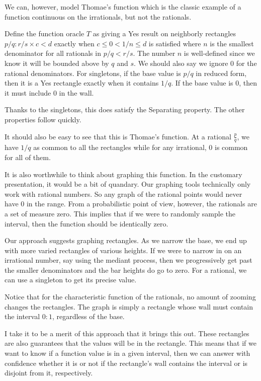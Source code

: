 \documentclass[12pt]{article}
\begin{document}
We can, however, model Thomae's function which is the classic example of a function continuous on the irrationals, but not the rationals. 

Define the function oracle $T$ as giving a Yes result on neighborly rectangles $p/q : r/s \times c\lt d$ exactly when $c \leq 0 \lt 1/n \leq d$ is satisfied where $n$ is the smallest denominator for all rationals in $p/q \lt r/s$. The number $n$ is well-defined since we know it will be bounded above by $q$ and $s$.  We should also say we ignore $0$ for the rational denominators. For singletons, if the base value is $p/q$ in reduced form, then it is a Yes rectangle exactly when it contains $1/q$. If the base value is $0$, then it must include $0$ in the wall.

Thanks to the singletons, this does satisfy the Separating property. The other properties follow quickly. 

It should also be easy to see that this is Thomae's function. At a rational $\frac{p}{q}$, we have $1/q$ as common to all the rectangles while for any irrational, $0$ is common for all of them. 

It is also worthwhile to think about graphing this function. In the customary presentation, it would be a bit of quandary. Our graphing tools technically only work with rational numbers. So any graph of the rational points would never have 0 in the range. From a probabilistic point of view, however, the rationals are a set of measure zero. This implies that if we were to randomly sample the interval, then the function should be identically zero. 

Our approach suggests graphing rectangles. As we narrow the base, we end up with more varied rectangles of various heights. If we were to narrow in on an irrational number, say using the mediant process, then we progressively get past the smaller denominators and the bar heights do go to zero. For a rational, we can use a singleton to get its precise value. 

Notice that for the characteristic function of the rationals, no amount of zooming changes the rectangles. The graph is simply a rectangle whose wall must contain the interval $0:1$, regardless of the base. 

I take it to be a merit of this approach that it brings this out. These rectangles are also guarantees that the values will be in the rectangle. This means that if we want to know if a function value is in a given interval, then we can answer with confidence whether it is or not if the rectangle's wall contains the interval or is disjoint from it, respectively. 
\end{document}
